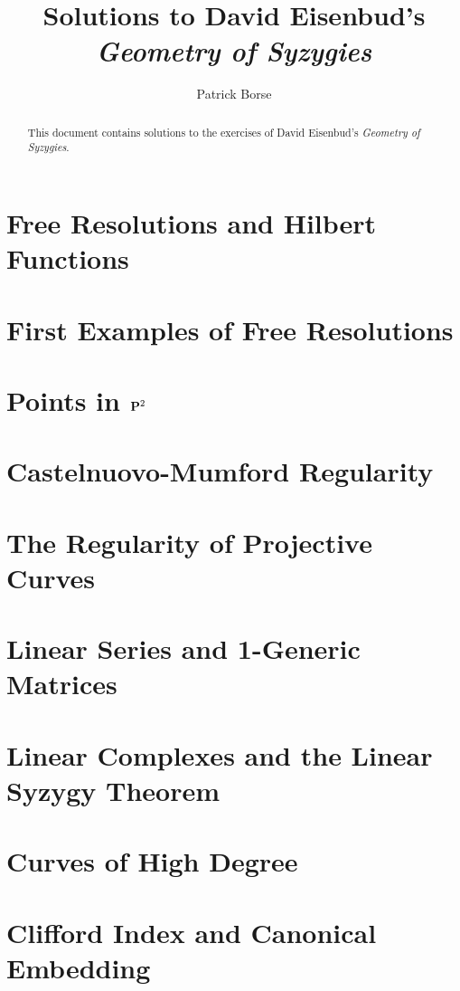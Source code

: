 \documentclass[oneside]{amsbook}
\title{Solutions to David Eisenbud's\\ \emph{Geometry of Syzygies}}
\author{Patrick Borse}
\begin{document}
\begin{abstract}
This document contains solutions to the exercises of David Eisenbud's \emph{Geometry of Syzygies}.
\end{abstract}

\maketitle

\tableofcontents

\chapter{Free Resolutions and Hilbert Functions}


\chapter{First Examples of Free Resolutions}


\chapter{Points in $\mathbf{P}^2$}


\chapter{Castelnuovo-Mumford Regularity}


\chapter{The Regularity of Projective Curves}


\chapter{Linear Series and 1-Generic Matrices}


\chapter{Linear Complexes and the Linear Syzygy Theorem}


\chapter{Curves of High Degree}


\chapter{Clifford Index and Canonical Embedding}

\end{document}
